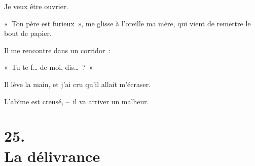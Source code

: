 \documentclass[french,twoside]{book} %
\newenvironment{quoteblock}%
  {\begin{quoting}}
  {\end{quoting}}
\newenvironment{quotebar}{%
    \def\FrameCommand{{\color{rubric!10!}\vrule width 0.5em} \hspace{0.9em}}%
    \def\OuterFrameSep{\itemsep} %
    \MakeFramed {\advance\hsize-\width \FrameRestore}
  }%
  {%
    \endMakeFramed
  }
\renewenvironment{quoteblock}%
  {%
    \savenotes
    \setstretch{0.9}
    \normalfont
    \begin{quotebar}
  }
  {%
    \end{quotebar}
    \spewnotes
  }
\begin{document}
\begin{quoteblock}
\noindent Je veux être ouvrier.\end{quoteblock}

\noindent « Ton père est furieux », me glisse à l’oreille ma mère, qui vient de remettre le bout de papier.\par
\bigbreak
\noindent Il me rencontre dans un corridor :\par
« Tu te f… de moi, dis… ? »\par
Il lève la main, et j’ai cru qu’il allait m’écraser.\par
L’abîme est creusé, – il va arriver un malheur.
\section[{25. La délivrance}]{25. \\
La délivrance}\renewcommand{\leftmark}{25. \\
La délivrance}
\end{document}
